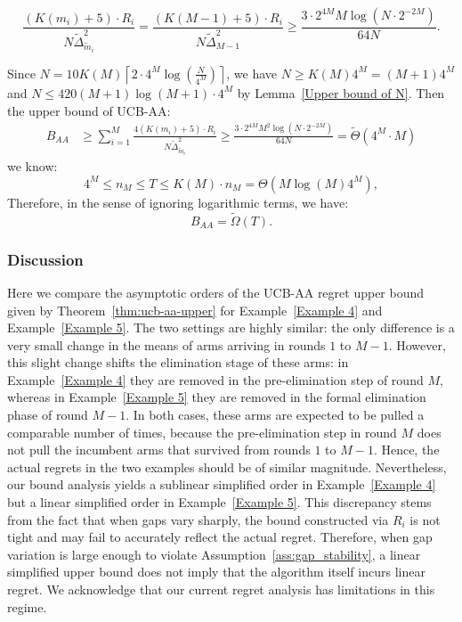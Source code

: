 \documentclass[
  12pt]{article}
\begin{document}
$$ \frac{(K(m_i)+5)\cdot R_i}{N\tilde{\Delta}_{\tilde{m}_i}^2} = \frac{(K(M-1)+5)\cdot R_i}{N\tilde{\Delta}_{M-1}^{2}}\ge \frac{3\cdot 2^{4M}M\log (N \cdot 2^{-2M})}{64N} .$$

Since $N=10 K(M) \left\lceil 2\cdot 4^M\log\left(\frac{N}{4^M}\right) \right\rceil$, we have $N \geq K(M)4^M =(M+1)4^M$ and $N\leq420(M+1)\log(M+1)\cdot 4^M $ by Lemma~\ref{Upper bound of N}. Then the upper bound of UCB-AA:
$$\begin{aligned}
B_{AA} &\ge  \sum_{i=1}^{M}  \frac{4\left(K(m_i)+5\right)\cdot R_i}{N\tilde{\Delta}_{\tilde{m}_i}^2}\ge \frac{3\cdot 2^{4M}M^2\log (N \cdot 2^{-2M})}{64N} = \tilde{\Theta} \left( 4^M \cdot M \right)
\end{aligned}$$
we know: 
\[4^M \leq n_M\leq T\leq K(M)\cdot n_M = \Theta(M\log(M)4^M), \]
Therefore, in the sense of ignoring logarithmic terms, we have:
$$B_{AA} =\tilde{\Omega}(T). $$

\subsubsection*{Discussion}
Here we compare the asymptotic orders of the UCB-AA regret upper bound given by Theorem~\ref{thm:ucb-aa-upper} for Example~\ref{Example 4} and Example~\ref{Example 5}. The two settings are highly similar: the only difference is a very small change in the means of arms arriving in rounds $1$ to $M-1$. However, this slight change shifts the elimination stage of these arms: in Example~\ref{Example 4} they are removed in the pre-elimination step of round $M$, whereas in Example~\ref{Example 5} they are removed in the formal elimination phase of round $M-1$. In both cases, these arms are expected to be pulled a comparable number of times, because the pre-elimination step in round $M$ does not pull the incumbent arms that survived from rounds $1$ to $M-1$. Hence, the actual regrets in the two examples should be of similar magnitude. Nevertheless, our bound analysis yields a sublinear simplified order in Example~\ref{Example 4} but a linear simplified order in Example~\ref{Example 5}. This discrepancy stems from the fact that when gaps vary sharply, the bound constructed via $R_i$ is not tight and may fail to accurately reflect the actual regret. Therefore, when gap variation is large enough to violate Assumption~\ref{ass:gap_stability}, a linear simplified upper bound does not imply that the algorithm itself incurs linear regret. We acknowledge that our current regret analysis has limitations in this regime.
\end{document}
